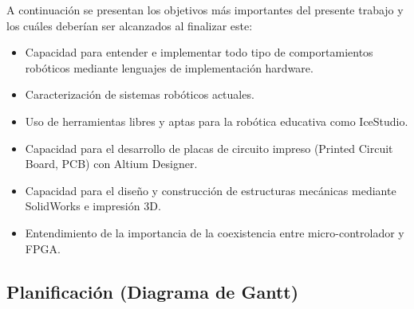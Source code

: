 A continuación se presentan los objetivos más importantes del presente trabajo y los cuáles deberían ser alcanzados al finalizar este:
\begin{itemize}
	\item Capacidad para entender e implementar todo tipo de comportamientos robóticos mediante lenguajes de implementación hardware.
	\item Caracterización de sistemas robóticos actuales.
	\item Uso de herramientas libres y aptas para la robótica educativa como IceStudio.
	\item Capacidad para el desarrollo de placas de circuito impreso (Printed Circuit Board, PCB) con Altium Designer.
	\item Capacidad para el diseño y construcción de estructuras mecánicas mediante SolidWorks e impresión 3D.
	\item Entendimiento de la importancia de la coexistencia entre micro-controlador y FPGA.
\end{itemize}

\subsection{Planificación (Diagrama de Gantt)}

